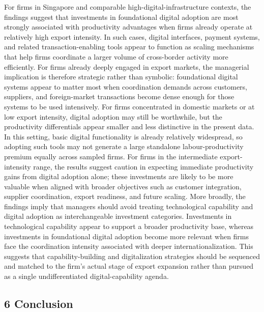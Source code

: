 \documentclass[
  12pt,a4paper]{article}
\begin{document}
For firms in Singapore and comparable high-digital-infrastructure
contexts, the findings suggest that investments in foundational digital
adoption are most strongly associated with productivity advantages when
firms already operate at relatively high export intensity. In such
cases, digital interfaces, payment systems, and related
transaction-enabling tools appear to function as scaling mechanisms that
help firms coordinate a larger volume of cross-border activity more
efficiently. For firms already deeply engaged in export markets, the
managerial implication is therefore strategic rather than symbolic:
foundational digital systems appear to matter most when coordination
demands across customers, suppliers, and foreign-market transactions
become dense enough for those systems to be used intensively. For firms
concentrated in domestic markets or at low export intensity, digital
adoption may still be worthwhile, but the productivity differentials
appear smaller and less distinctive in the present data. In this
setting, basic digital functionality is already relatively widespread,
so adopting such tools may not generate a large standalone
labour-productivity premium equally across sampled firms. For firms in
the intermediate export-intensity range, the results suggest caution in
expecting immediate productivity gains from digital adoption alone;
these investments are likely to be more valuable when aligned with
broader objectives such as customer integration, supplier coordination,
export readiness, and future scaling. More broadly, the findings imply
that managers should avoid treating technological capability and digital
adoption as interchangeable investment categories. Investments in
technological capability appear to support a broader productivity base,
whereas investments in foundational digital adoption become more
relevant when firms face the coordination intensity associated with
deeper internationalization. This suggests that capability-building and
digitalization strategies should be sequenced and matched to the firm's
actual stage of export expansion rather than pursued as a single
undifferentiated digital-capability agenda.

\hypertarget{conclusion}{%
\subsection{6 Conclusion}\label{conclusion}}
\end{document}
